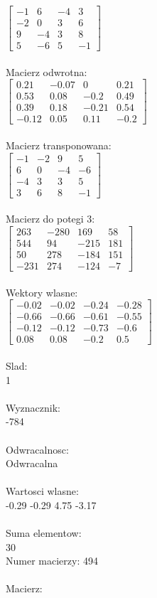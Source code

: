 \documentclass[a4paper,12pt]{article}
\begin{document}
$\begin{bmatrix} -1&6&-4&3\\-2&0&3&6\\9&-4&3&8\\5&-6&5&-1 \end{bmatrix}$
\\
\\
Macierz odwrotna:\\

$\begin{bmatrix} 0.21&-0.07&0&0.21\\0.53&0.08&-0.2&0.49\\0.39&0.18&-0.21&0.54\\-0.12&0.05&0.11&-0.2 \end{bmatrix}$
\\
\\
Macierz transponowana:\\

$\begin{bmatrix} -1&-2&9&5\\6&0&-4&-6\\-4&3&3&5\\3&6&8&-1 \end{bmatrix}$
\\
\\
Macierz do potegi 3:\\

$\begin{bmatrix} 263&-280&169&58\\544&94&-215&181\\50&278&-184&151\\-231&274&-124&-7 \end{bmatrix}$
\\
\\
Wektory wlasne:\\

$\begin{bmatrix} -0.02&-0.02&-0.24&-0.28\\-0.66&-0.66&-0.61&-0.55\\-0.12&-0.12&-0.73&-0.6\\0.08&0.08&-0.2&0.5 \end{bmatrix}$
\\
\\
Slad:\\
1
\\
\\
Wyznacznik:\\
-784
\\
\\
Odwracalnosc:\\
Odwracalna
\\
\\
Wartosci wlasne:\\
-0.29 -0.29 4.75 -3.17
\\
\\
Suma elementow:\\
30
\\
\newpage
Numer macierzy:
494
\\
\\
Macierz:\\
\end{document}
